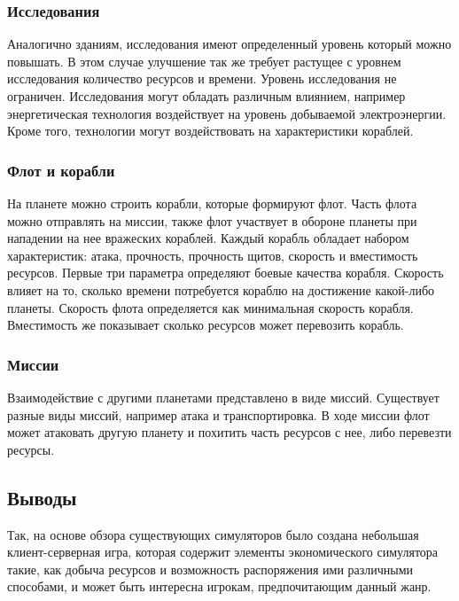 \subsubsection{Исследования}
Аналогично зданиям, исследования имеют определенный уровень который можно повышать. В этом случае улучшение так же требует растущее с уровнем исследования количество ресурсов и времени. Уровень исследования не ограничен. Исследования могут обладать различным влиянием, например энергетическая технология воздействует на уровень добываемой электроэнергии. Кроме того, технологии могут воздействовать на характеристики кораблей. 

\subsubsection{Флот и корабли}
На планете можно строить корабли, которые формируют флот. Часть флота можно отправлять на миссии, также флот участвует в обороне планеты при нападении на нее вражеских кораблей. Каждый корабль обладает набором характеристик: атака, прочность, прочность щитов, скорость и вместимость ресурсов. Первые три параметра определяют боевые качества корабля. Скорость влияет на то, сколько времени потребуется кораблю на достижение какой-либо планеты. Скорость флота определяется как минимальная скорость корабля. Вместимость же показывает сколько ресурсов может перевозить корабль.

\subsubsection{Миссии}
Взаимодействие с другими планетами представлено в виде миссий. Существует разные виды миссий, например атака и транспортировка. В ходе миссии флот может атаковать другую планету и похитить часть ресурсов с нее, либо перевезти ресурсы.


\subsection{Выводы}
Так, на основе обзора существующих симуляторов было создана небольшая клиент-серверная игра, которая содержит элементы экономического симулятора такие, как добыча ресурсов и возможность распоряжения ими различными способами, и может быть интересна игрокам, предпочитающим данный жанр.


